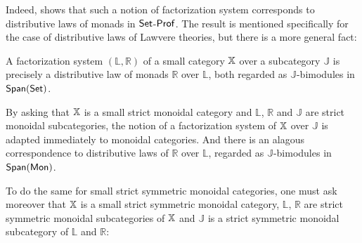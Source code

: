  Indeed, \cite{lawvere} shows that such a notion of factorization system corresponds to distributive laws of monads in $\mathsf{Set}$-${\sf Prof}$.   The result is mentioned specifically for the case of distributive laws of Lawvere theories, but there is a more general fact:


\begin{lemma}
A factorization system $(\mathbb{L},\mathbb{R})$ of a small  category $\mathbb{X}$ over a subcategory  $\mathbb J $ is precisely a distributive law of monads  $\mathbb{R}$ over $\mathbb{L}$, both regarded as $\mathbb{J}$-bimodules in $\mathsf{Span}(\mathsf{Set})$.
\end{lemma}


By asking that $\mathbb{X}$ is a small strict monoidal category and  $\mathbb{L}$, $\mathbb{R}$ and $\mathbb{J}$ are strict monoidal subcategories, the notion of a factorization system of $\mathbb{X}$ over $\mathbb J$ is adapted immediately to  monoidal categories. And there is an alagous correspondence  to distributive laws of $\mathbb{R}$ over $\mathbb{L}$, regarded as $\mathbb J$-bimodules in $\mathsf{Span}({\sf Mon})$.  


To do the same for small strict symmetric monoidal categories, one must ask moreover that $\mathbb{X}$ is a small strict symmetric monoidal category, $\mathbb{L}$, $\mathbb{R}$ are strict symmetric monoidal subcategories of $\mathbb{X}$ and $\mathbb J$ is a strict symmetric monoidal subcategory of $\mathbb L$ and $\mathbb R$:

%
%
%
%
%
%
%
%
%


